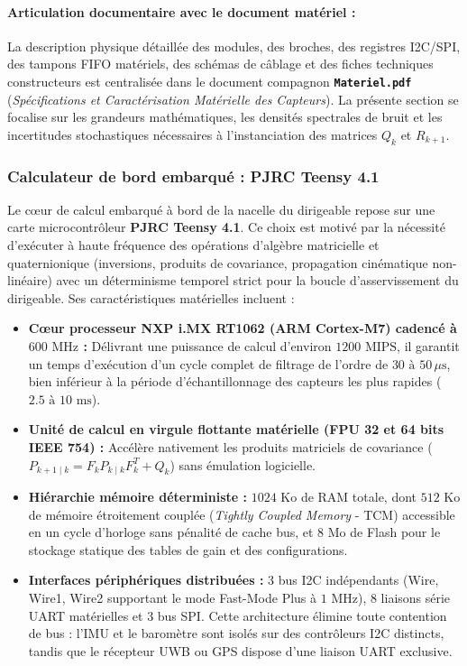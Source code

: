 \documentclass[../Formulations_Kalman.tex]{subfiles}
\begin{document}
\paragraph{Articulation documentaire avec le document matériel :}
La description physique détaillée des modules, des broches, des registres I2C/SPI, des tampons FIFO matériels, des schémas de câblage et des fiches techniques constructeurs est centralisée dans le document compagnon \textbf{\texttt{Materiel.pdf}} (\textit{Spécifications et Caractérisation Matérielle des Capteurs}). La présente section se focalise sur les grandeurs mathématiques, les densités spectrales de bruit et les incertitudes stochastiques nécessaires à l'instanciation des matrices $Q_k$ et $R_{k+1}$.

\subsubsection{Calculateur de bord embarqué : PJRC Teensy 4.1}
Le cœur de calcul embarqué à bord de la nacelle du dirigeable repose sur une carte microcontrôleur \textbf{PJRC Teensy 4.1}. Ce choix est motivé par la nécessité d'exécuter à haute fréquence des opérations d'algèbre matricielle et quaternionique (inversions, produits de covariance, propagation cinématique non-linéaire) avec un déterminisme temporel strict pour la boucle d'asservissement du dirigeable. Ses caractéristiques matérielles incluent :
\begin{itemize}
    \item \textbf{Cœur processeur NXP i.MX RT1062 (ARM Cortex-M7) cadencé à $600\text{ MHz}$ :} Délivrant une puissance de calcul d'environ $1200\text{ MIPS}$, il garantit un temps d'exécution d'un cycle complet de filtrage de l'ordre de $30\text{ à }50\,\mu\text{s}$, bien inférieur à la période d'échantillonnage des capteurs les plus rapides ($2.5\text{ à }10\text{ ms}$).
    \item \textbf{Unité de calcul en virgule flottante matérielle (FPU 32 et 64 bits IEEE 754) :} Accélère nativement les produits matriciels de covariance ($P_{k+1\mid k} = F_k P_{k\mid k} F_k^T + Q_k$) sans émulation logicielle.
    \item \textbf{Hiérarchie mémoire déterministe :} $1024\text{ Ko}$ de RAM totale, dont $512\text{ Ko}$ de mémoire étroitement couplée (\textit{Tightly Coupled Memory} - TCM) accessible en un cycle d'horloge sans pénalité de cache bus, et $8\text{ Mo}$ de Flash pour le stockage statique des tables de gain et des configurations.
    \item \textbf{Interfaces périphériques distribuées :} 3 bus I2C indépendants (Wire, Wire1, Wire2 supportant le mode Fast-Mode Plus à $1\text{ MHz}$), 8 liaisons série UART matérielles et 3 bus SPI. Cette architecture élimine toute contention de bus : l'IMU et le baromètre sont isolés sur des contrôleurs I2C distincts, tandis que le récepteur UWB ou GPS dispose d'une liaison UART exclusive.
\end{itemize}
\end{document}
